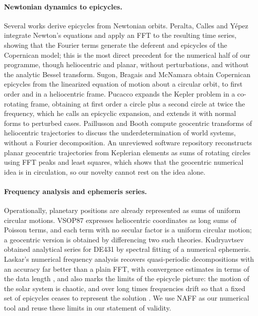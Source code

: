 \paragraph*{Newtonian dynamics to epicycles.}
Several works derive epicycles from Newtonian orbits. Peralta, Calles and
Y\'epez \cite{Peralta2003} integrate Newton's equations and apply an FFT to the
resulting time series, showing that the Fourier terms generate the deferent
and epicycles of the Copernican model; this is the most direct precedent for
the numerical half of our programme, though heliocentric and planar, without
perturbations, and without the analytic Bessel transform. Sugon, Bragais and
McNamara \cite{Sugon2008} obtain Copernican epicycles from the linearized
equation of motion about a circular orbit, to first order and in a
heliocentric frame. Pucacco \cite{Pucacco2012} expands the Kepler problem in
a co-rotating frame, obtaining at first order a circle plus a second circle
at twice the frequency, which he calls an epicyclic expansion, and extends it
with normal forms to perturbed cases. Paillusson and
Booth \cite{Paillusson2020} compute geocentric transforms of heliocentric
trajectories to discuss the underdetermination of world systems, without a
Fourier decomposition. An unreviewed software repository \cite{epa058}
reconstructs planar geocentric trajectories from Keplerian elements as sums
of rotating circles using FFT peaks and least squares, which shows that the
geocentric numerical idea is in circulation, so our novelty cannot rest on
the idea alone.

\paragraph*{Frequency analysis and ephemeris series.}
Operationally, planetary positions are already represented as sums of uniform
circular motions. VSOP87 \cite{Bretagnon1988} expresses heliocentric
coordinates as long sums of Poisson terms, and each term with no secular
factor is a uniform circular motion; a geocentric version is obtained by
differencing two such theories. Kudryavtsev \cite{Kudryavtsev2016} obtained
analytical series for DE431 by spectral fitting of a numerical ephemeris.
Laskar's numerical frequency analysis \cite{Laskar1990,Laskar1992,Laskar1993,%
Laskar1999} recovers quasi-periodic decompositions with an accuracy far
better than a plain FFT, with convergence estimates in terms of the data
length \cite{Laskar2003}, and also marks the limits of the epicycle picture:
the motion of the solar system is chaotic, and over long times
frequencies drift so that a fixed set of epicycles ceases to represent the
solution \cite{Laskar1990,FuLaskar2019}. We use NAFF as our numerical
tool and reuse these limits in our statement of validity.

